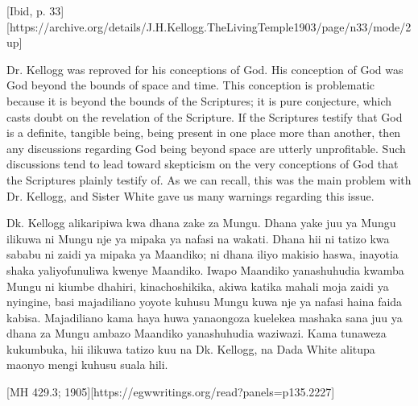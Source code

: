 [Ibid, p. 33][https://archive.org/details/J.H.Kellogg.TheLivingTemple1903/page/n33/mode/2up]


Dr. Kellogg was reproved for his conceptions of God. His conception of God was God beyond the bounds of space and time. This conception is problematic because it is beyond the bounds of the Scriptures; it is pure conjecture, which casts doubt on the revelation of the Scripture. If the Scriptures testify that God is a definite, tangible being, being present in one place more than another, then any discussions regarding God being beyond space are utterly unprofitable. Such discussions tend to lead toward skepticism on the very conceptions of God that the Scriptures plainly testify of. As we can recall, this was the main problem with Dr. Kellogg, and Sister White gave us many warnings regarding this issue.


Dk. Kellogg alikaripiwa kwa dhana zake za Mungu. Dhana yake juu ya Mungu ilikuwa ni Mungu nje ya mipaka ya nafasi na wakati. Dhana hii ni tatizo kwa sababu ni zaidi ya mipaka ya Maandiko; ni dhana iliyo makisio haswa, inayotia shaka yaliyofunuliwa kwenye Maandiko. Iwapo Maandiko yanashuhudia kwamba Mungu ni kiumbe dhahiri, kinachoshikika, akiwa katika mahali moja zaidi ya nyingine, basi majadiliano yoyote kuhusu Mungu kuwa nje ya nafasi haina faida kabisa. Majadiliano kama haya huwa yanaongoza kuelekea mashaka sana juu ya dhana za Mungu ambazo Maandiko yanashuhudia waziwazi. Kama tunaweza kukumbuka, hii ilikuwa tatizo kuu na Dk. Kellogg, na Dada White alitupa maonyo mengi kuhusu suala hili.


[MH 429.3; 1905][https://egwwritings.org/read?panels=p135.2227]


